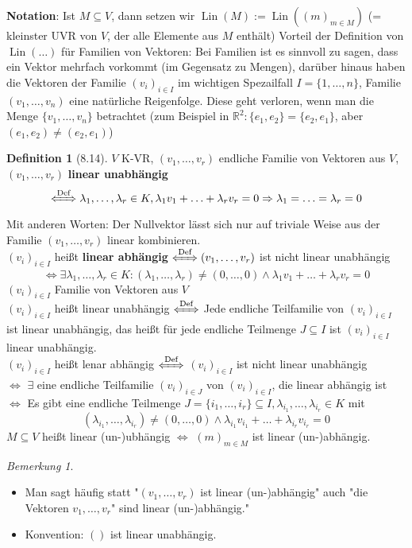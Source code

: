 \documentclass[a4paper]{scrartcl}
\DeclareMathOperator{\Exists}{\exists}
\DeclareMathOperator{\Lin}{Lin}
\theoremstyle{definition}
\newtheorem{defn}{Definition}
\theoremstyle{plain}
\theoremstyle{plain}
\theoremstyle{remark}
\newtheorem{remark}{Bemerkung}
\theoremstyle{remark}
\theoremstyle{remark}
\begin{document}
\textbf{Notation}:
Ist $M\subseteq V$, dann setzen wir $\Lin(M) := \Lin((m)_{m \in M})$ (= kleinster UVR von $V$, der alle Elemente aus $M$ enthält)
Vorteil der Definition von $\Lin(\ldots)$ für Familien von Vektoren: Bei Familien ist es sinnvoll zu sagen, dass ein Vektor mehrfach vorkommt (im Gegensatz zu Mengen), darüber hinaus haben die Vektoren der Familie $(v_i)_{i \in I}$ im wichtigen Spezailfall $I = \{1,\ldots,n\}$,
Familie $(v_1, \ldots, v_n)$ eine natürliche Reigenfolge. Diese geht verloren, wenn man die Menge $\{v_1, \ldots, v_n\}$ betrachtet (zum Beispiel in $\mathbb{R}^2:\{e_1, e_2\} = \{e_2, e_1\}$, aber $(e_1, e_2) \neq (e_2, e_1)$)
\begin{defn}[8.14]
$V$ K-VR, $(v_1, \ldots, v_r)$ endliche Familie von Vektoren aus $V$, $(v_1, \ldots, v_r)$ \textbf{linear unabhängig}
\[\xLeftrightarrow{\text{Def}} \lambda_1, \ldots, \lambda_r \in K, \lambda_1 v_1 + \ldots + \lambda_r v_r = 0 \Rightarrow \lambda_1 = \ldots = \lambda_r = 0\]
Mit anderen Worten: Der Nullvektor lässt sich nur auf triviale Weise aus der Familie $(v_1, \ldots, v_r)$ linear kombinieren. \\
  $(v_i)_{i\in I}$ heißt \textbf{linear abhängig} $\xLeftrightarrow{\text{Def}} (v_1, \ldots, v_r)$ ist nicht linear unabhängig
\[\Leftrightarrow \Exists \lambda_1, \ldots, \lambda_r \in K: (\lambda_1, \ldots, \lambda_r) \neq (0, \ldots, 0) \wedge \lambda_1 v_1 + \ldots + \lambda_r v_r = 0\]
$(v_i)_{i\in I}$ Familie von Vektoren aus $V$ \\
  $(v_i)_{i\in I}$ heißt linear unabhängig $\xLeftrightarrow{\text{Def}}$ Jede endliche Teilfamilie von $(v_i)_{i\in I}$ ist linear unabhängig, das heißt für jede endliche Teilmenge $J\subseteq I$ ist $(v_i)_{i\in I}$ linear unabhängig. \\
  $(v_i)_{i\in I}$ heißt lenar abhängig $\xLeftrightarrow{\text{Def}}$ $(v_i)_{i\in I}$ ist nicht linear unabhängig \\
  $\Leftrightarrow$ $\Exists$ eine endliche Teilfamilie $(v_i)_{i\in J}$ von $(v_i)_{i \in I}$, die linear abhängig ist \\
  $\Leftrightarrow$ Es gibt eine endliche Teilmenge $J = \{i_1, \ldots, i_r\} \subseteq I, \lambda_{i_1},\ldots,\lambda_{i_r} \in K$ mit
\[(\lambda_{i_1}, \ldots, \lambda_{i_r}) \neq (0, \ldots, 0) \wedge \lambda_{i_1} v_{i_1} + \ldots + \lambda_{i_r} v_{i_r} = 0\]
$M \subseteq V$ heißt linear (un-)ubhängig $\Leftrightarrow$ $(m)_{m\in M}$ ist linear (un-)abhängig.
\end{defn}
\begin{remark}
\begin{itemize}
\item Man sagt häufig statt "$(v_1, \ldots, v_r)$ ist linear (un-)abhängig" auch "die Vektoren $v_1, \ldots, v_r$" sind linear (un-)abhängig."
\item Konvention: $()$ ist linear unabhängig.
\end{itemize}
\end{remark}
\end{document}

